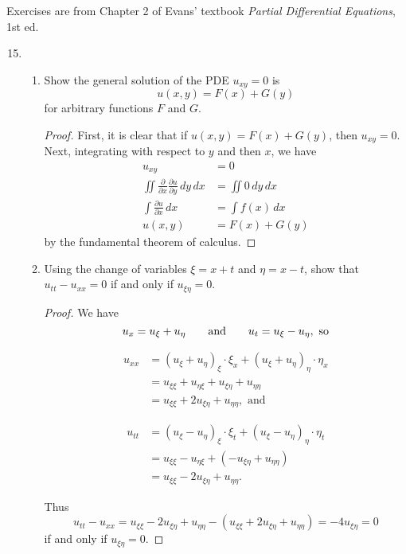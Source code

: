 \documentclass[11pt,oneside,english]{amsart}
\theoremstyle{definition}
\newcommand{\aspace}{\hspace{7mm}\text{and}\hspace{7mm}}
\newcommand{\pp}[2]{\frac{\partial{#1}}{\partial{#2}}}
\begin{document}
\rightline{\today}


Exercises are from Chapter 2 of Evans' textbook \textit{Partial Differential Equations}, 1st ed. 

\vspace{5mm}
\begin{enumerate}

\setcounter{enumi}{14}





\item \begin{enumerate} \item Show the general solution of the PDE $u_{xy}=0$ is
\[u(x,y)=F(x)+G(y)\]
for arbitrary functions $F$ and $G$.

\begin{proof}
First, it is clear that if $u(x,y)=F(x)+G(y)$, then $u_{xy}=0$. Next, integrating with respect to $y$ and then $x$, we have
\begin{align*}
u_{xy}&=0\\[2mm]
\iint\pp{}{x}\pp{u}{y}\,dy\,dx&=\iint 0\,dy\,dx\\[2mm]
\int\pp{u}{x}\,dx&=\int f(x)\,dx\\[2mm]
u(x,y)&=F(x)+G(y)
\end{align*}
by the fundamental theorem of calculus.
\end{proof}

\item Using the change of variables $\xi=x+t$ and $\eta=x-t$, show that $u_{tt}-u_{xx}=0$ if and only if $u_{\xi\eta}=0$.

\begin{proof}
We have
\[
u_x=u_\xi+u_\eta \aspace u_t=u_\xi-u_\eta,\text{ so}
\]
\begin{multicols}{2}
\begin{align*}
u_{xx}&=(u_\xi+u_\eta)_\xi\cdot\xi_x+(u_\xi+u_\eta)_\eta\cdot\eta_x\\[2mm]
&=u_{\xi\xi}+u_{\eta\xi}+u_{\xi\eta}+u_{\eta\eta}\\[2mm]
&=u_{\xi\xi}+2u_{\xi\eta}+u_{\eta\eta},\text{ and}
\end{align*}

\begin{align*}
u_{tt}&=(u_\xi-u_\eta)_\xi\cdot\xi_t+(u_\xi-u_\eta)_\eta\cdot\eta_t\\[2mm]
&=u_{\xi\xi}-u_{\eta\xi}+(-u_{\xi\eta}+u_{\eta\eta})\\[2mm]
&=u_{\xi\xi}-2u_{\xi\eta}+u_{\eta\eta}.
\end{align*}
\end{multicols}
Thus
\[
u_{tt}-u_{xx}=u_{\xi\xi}-2u_{\xi\eta}+u_{\eta\eta}-(u_{\xi\xi}+2u_{\xi\eta}+u_{\eta\eta})=-4u_{\xi\eta}=0
\]
if and only if $u_{\xi\eta}=0$.
\end{proof}


\end{enumerate}
\end{enumerate}
\end{document}
